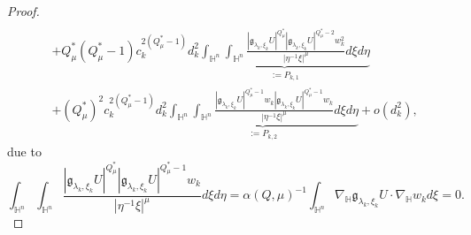 \documentclass[11pt]{article}
\begin{document}
\begin{proof}
\begin{align}
\nonumber  \\&  + Q_{\mu}^{\ast}(Q_{\mu}^{\ast}-1)c_k^{2(Q_{\mu}^{\ast}-1)}d_k^2 \underbrace{\int_{\mathbb{H}^{n}}\int_{\mathbb{H}^{n}}\frac{|\mathfrak{g}_{\lambda_k,\xi_k}U|^{Q^{\ast}_{\mu}}|\mathfrak{g}_{\lambda_k,\xi_k}U|
^{Q^{\ast}_{\mu}-2} w_k^2}{|\eta^{-1}\xi|^{\mu}}{d}\xi{d}\eta}_{:=P_{k,1}} \nonumber\\
    & + (Q_{\mu}^{\ast})^2c_k^{2(Q_{\mu}^{\ast}-1)}d_k^2 \underbrace{\int_{\mathbb{H}^{n}}\int_{\mathbb{H}^{n}}\frac{|\mathfrak{g}_{\lambda_k,\xi_k}U|^{Q^{\ast}_{\mu}-1}w_k|\mathfrak{g}_{\lambda_k,\xi_k}U|
^{Q^{\ast}_{\mu}-1}w_k}{|\eta^{-1}\xi|^{\mu}}{d}\xi{d}\eta}_{:=P_{k,2}}+ o(d_k^2),
    \end{align}
    due to
    \begin{equation*}
      \int_{\mathbb{H}^{n}}\int_{\mathbb{H}^{n}}\frac{|\mathfrak{g}_{\lambda_k,\xi_k}U|^{Q^{\ast}_{\mu}}|\mathfrak{g}_{\lambda_k,\xi_k}U|
^{Q^{\ast}_{\mu}-1}w_k}{|\eta^{-1}\xi|^{\mu}}{d}\xi{d}\eta=\alpha(Q,\mu)^{-1}\int_{\mathbb{H}^{n}} \nabla_\mathbb{H}\mathfrak{g}_{\lambda_k,\xi_k}U\cdot \nabla_\mathbb{H}w_k d\xi=0.
    \end{equation*}

\end{proof}
\end{document}
